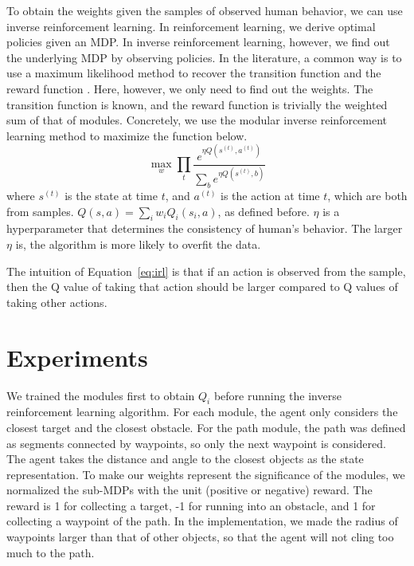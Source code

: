 \documentclass[11pt]{article} %
\begin{document}
To obtain the weights given the samples of observed human behavior, we can use inverse
reinforcement learning. In reinforcement learning, we derive 
optimal policies given an MDP. In inverse reinforcement learning, however, we
find out the underlying MDP by observing policies. In the literature, a common
way is to use a maximum likelihood method to recover the transition function and
the reward function \cite{ng2000algorithms}. Here, however, we only need to find
out the weights. The transition function is known, and the reward function is
trivially the weighted sum of that of modules. Concretely, we use the modular
inverse reinforcement learning method \cite{rothkopf2013modular} to maximize the
function below.
\begin{equation}
\label{eq:irl}
\max_w \prod_t \frac{e^{\eta Q(s^{(t)}, a^{(t)})}}{\sum_b e^{\eta Q(s^{(t)}, b)}}
\end{equation}
where $s^{(t)}$ is the state at time $t$, and $a^{(t)}$ is the action at time
$t$, which are both from samples. $Q(s, a) = \sum_i w_i Q_i(s_i, a)$, as defined
before. $\eta$ is a hyperparameter that determines the consistency of human's
behavior. The larger $\eta$ is, the algorithm is more likely to overfit the data.

The intuition of Equation~\ref{eq:irl} is that if an action is observed from the
sample, then the Q value of taking that action should be larger compared to Q
values of taking other actions.

\section{Experiments}
\label{sec:exp}

We trained the modules first to obtain $Q_i$ before running the inverse
reinforcement learning algorithm. For each module, the agent only considers the
closest target and the closest obstacle. For the path module, the path was
defined as segments connected by waypoints, so only the next waypoint is
considered. The agent takes the distance and angle to the closest objects as the
state representation. To make our weights represent the significance of the
modules, we normalized the sub-MDPs with the unit (positive or negative) reward.
The reward is 1 for collecting a target, -1 for running into an obstacle, and 1
for collecting a waypoint of the path. In the implementation, we made the radius
of waypoints larger than that of other objects, so that the agent will not cling
too much to the path.
\end{document}
